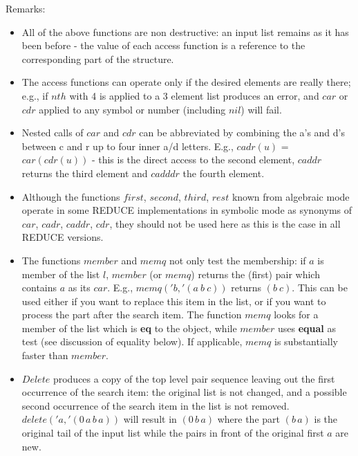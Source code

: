 \documentclass[11pt]{article}
\makeatletter
\newcommand{\reduce}{\small REDUCE}
\newcommand{\ttindex}[1]{\index{#1@{\texttt{#1}}}}
\makeatother
\begin{document}
Remarks:
\begin{itemize}
\item All of the above functions are non destructive: an
  input list remains as it has been before - the value of each
  access function is a reference to the corresponding part of the
  structure.
\item The access functions can operate only if the desired elements
  are really there; e.g.,  if $nth$ with 4 is applied to a 3 element
  list produces an error, and $car$ or $cdr$ applied to any symbol
  or number (including $nil$) will fail.
\item Nested calls of $car$ and $cdr$ can be abbreviated by
  combining the a's and d's between c and r up to four inner a/d letters.
  E.g., $cadr(u)$ = $car(cdr(u))$ \ttindex{c...r}
   - this is the direct access
  to the second element, $caddr$ returns the third element and
  $cadddr$ the fourth element.
\item Although the functions $first$, $second$, $third$, $rest$
  known from algebraic mode operate in some {\reduce}
  implementations in symbolic mode as synonyms of $car$,
  $cadr$, $caddr$, $cdr$, they should not be used here as
  this is the case in all {\reduce} versions.
\item The functions $member$ and $memq$ not only test the membership:
  if $a$ is member of the list $l$, $member$ (or $memq$) returns the (first)
  pair which contains $a$ as its $car$. E.g., $memq('b,'(a\ b\ c))$
  returns $(b\ c)$. This can be used either if you want to replace
  this item in the list, or if you want to process the part after
  the search item.
  The function $memq$ looks for a member of the list which is \textbf{eq}
  to the object, while $member$ uses \textbf{equal} as test (see discussion
  of equality below).  If applicable, $memq$ is substantially faster than
  $member$.
\item $Delete$ produces a copy of the top level pair sequence leaving
  out the first occurrence of the search item: the original list is
  not changed, and a possible second occurrence of the search item
  in the list is not removed. $delete('a,'(0\,a\,b\,a))$ will result
  in $(0\,b\,a)$ where the part $(b\,a)$ is the original tail of the
  input list while the pairs in front of the original first $a$
  are new.
\end{itemize}
\end{document}
